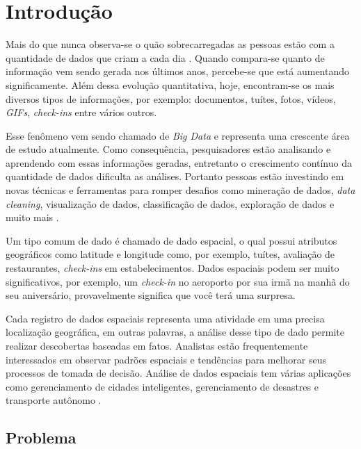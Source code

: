 \chapter{Introdução}
\label{chap:introducao}

Mais do que nunca observa-se o quão sobrecarregadas as pessoas estão com a quantidade de dados que criam a cada dia \cite{Pradeep2017}. Quando compara-se quanto de informação vem sendo gerada nos últimos anos, percebe-se que está aumentando significamente. Além dessa evolução quantitativa, hoje, encontram-se os mais diversos tipos de informações, por exemplo: documentos, tuítes, fotos, vídeos, \textit{GIFs}, \textit{check-ins} entre vários outros.

Esse fenômeno vem sendo chamado de \textit{Big Data} e representa uma crescente área de estudo atualmente. Como consequência, pesquisadores estão analisando e aprendendo com essas informações geradas, entretanto o crescimento contínuo da quantidade de dados dificulta as análises. Portanto pessoas estão investindo em novas técnicas e ferramentas para romper desafios como mineração de dados, {\em data cleaning}, visualização de dados, classificação de dados, exploração de dados e muito mais \cite{Zhang2015}.

Um tipo comum de dado é chamado de dado espacial, o qual  possui atributos geográficos como latitude e longitude como, por exemplo, tuítes, avaliação de restaurantes, {\em check-ins} em estabelecimentos. Dados espaciais podem ser muito significativos, por exemplo, um {\em check-in} no aeroporto por sua irmã na manhã do seu aniversário, provavelmente significa que você terá uma surpresa.

Cada registro de dados espaciais representa uma atividade em uma precisa localização geográfica, em outras palavras, a análise desse tipo de dado permite realizar descobertas baseadas em fatos. Analistas estão frequentemente interessados em observar padrões espaciais e tendências para melhorar seus processos de tomada de decisão. Análise de dados espaciais tem várias aplicações como gerenciamento de cidades inteligentes, gerenciamento de desastres e transporte autônomo \cite{RoddickEHPS04,Telang:2012}.

\section{Problema}

